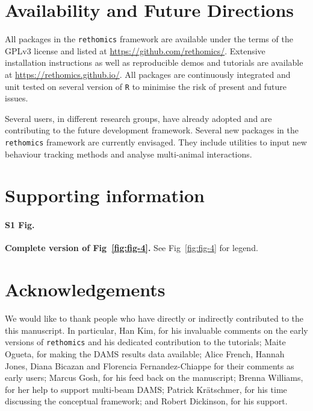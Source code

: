 \documentclass[10pt,letterpaper]{article}\usepackage[]{graphicx}\usepackage[]{color}
\begin{document}
% 

\section*{Availability and Future Directions}
All packages in the \texttt{rethomics} framework are available under the terms of the GPLv3 license and listed at
\href{https://github.com/rethomics}{https://github.com/rethomics/}.
Extensive installation instructions as well as reproducible demos and tutorials are available at
\href{https://rethomics.github.io/}{https://rethomics.github.io/}.
All packages are continuously integrated and unit tested on several version of \texttt{R} to minimise the risk of present and future issues.

Several users, in different research groups, have already adopted and are contributing to the future development framework.
Several new packages in the \texttt{rethomics} framework are currently envisaged. 
They include utilities to input new behaviour tracking methods and analyse multi-animal interactions.

\section*{Supporting information}

\paragraph*{S1 Fig.}
\label{S1-Fig}
{\bf Complete version of Fig~\ref{fig:fig-4}.}
See Fig~\ref{fig:fig-4} for legend.


\section*{Acknowledgements}
We would like to thank people who have directly or indirectly contributed to the this manuscript.
In particular, Han Kim, for his invaluable comments on the early versions of \texttt{rethomics} and his dedicated contribution to the tutorials;
Maite Ogueta, for making the DAMS results data available;
Alice French, Hannah Jones, Diana Bicazan and Florencia Fernandez-Chiappe for their comments as early users;
Marcus Gosh, for his feed back on the manuscript;
Brenna Williams, for her help to support multi-beam DAMS;
Patrick Kr{\"a}tschmer, for his time discussing the conceptual framework;
and Robert Dickinson, for his support.
\end{document}
